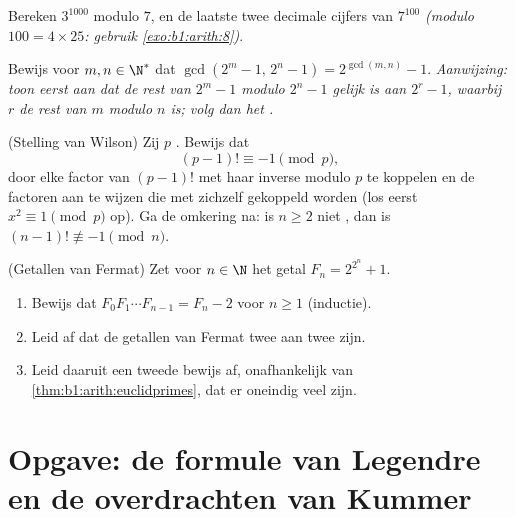 \begin{exercise}[$\star\star$]\label{exo:b1:arith:9}
Bereken $3^{1000}$ modulo $7$, en de laatste twee decimale cijfers van
$7^{100}$ \emph{(modulo $100 = 4 \times 25$: gebruik
\cref{exo:b1:arith:8})}.
\end{exercise}

\begin{exercise}[$\star\star\star$]\label{exo:b1:arith:10}
Bewijs voor $m, n \in \N^*$ dat $\gcd(2^m - 1,\, 2^n - 1) =
2^{\gcd(m,n)} - 1$. \emph{Aanwijzing: toon eerst aan dat de rest van $2^m
- 1$ modulo $2^n - 1$ gelijk is aan $2^r - 1$, waarbij $r$ de rest van
$m$ modulo $n$ is; volg dan het .}
\end{exercise}

\begin{exercise}[$\star\star\star$]\label{exo:b1:arith:11}
(Stelling van Wilson) Zij $p$ . Bewijs dat
\[
(p-1)! \equiv -1 \pmod p ,
\]
door elke factor van $(p-1)!$ met haar inverse modulo $p$ te koppelen en
de factoren aan te wijzen die met zichzelf gekoppeld worden (los eerst
$x^2 \equiv 1 \pmod p$ op). Ga de omkering na: is $n \geq 2$ niet ,
dan is $(n-1)! \not\equiv -1 \pmod n$.
\end{exercise}

\begin{exercise}[$\star\star\star$]\label{exo:b1:arith:12}
(Getallen van Fermat) Zet voor $n \in \N$ het getal $F_n = 2^{2^n} + 1$.
\begin{enumerate}
  \item Bewijs dat $F_0 F_1 \cdots F_{n-1} = F_n - 2$ voor $n \geq 1$
        (inductie).
  \item Leid af dat de getallen van Fermat twee aan twee 
        zijn.
  \item Leid daaruit een tweede bewijs af, onafhankelijk van
        \cref{thm:b1:arith:euclidprimes}, dat er oneindig veel
         zijn.
\end{enumerate}
\end{exercise}

\section{Opgave: de formule van Legendre en de overdrachten van Kummer}


